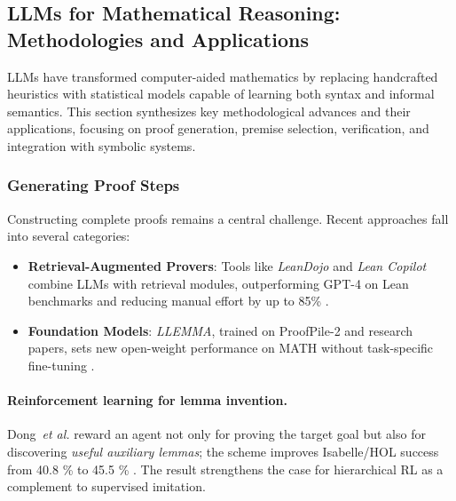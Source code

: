 \documentclass[acmsmall,anonymous]{acmart}
\begin{document}
\subsection{LLMs for Mathematical Reasoning: Methodologies and Applications}
LLMs have transformed computer-aided mathematics by replacing handcrafted heuristics with statistical models capable of learning both syntax and informal semantics. This section synthesizes key methodological advances and their applications, focusing on proof generation, premise selection, verification, and integration with symbolic systems. 

\subsubsection{Generating Proof Steps}\label{sec:proof-steps}
Constructing complete proofs remains a central challenge. Recent approaches fall into several categories:   
\begin{itemize}
    \item \textbf{Retrieval-Augmented Provers}: Tools like \emph{LeanDojo} and \emph{Lean Copilot} combine LLMs with retrieval modules, outperforming GPT-4 on Lean benchmarks and reducing manual effort by up to 85\% \cite{yang2023leandojo, huang2024leancopilot}.
    \item \textbf{Foundation Models}: \emph{LLEMMA}, trained on ProofPile-2 and research papers, sets new open-weight performance on MATH without task-specific fine-tuning \cite{azerbayev2024llemma}.
\end{itemize}

\paragraph{Reinforcement learning for lemma invention.}
Dong~\emph{et al.} reward an agent not only for proving the target
goal but also for discovering \emph{useful auxiliary lemmas}; the scheme
improves Isabelle/HOL success from 40.8 \% to 45.5 \%
\cite{dong2024lemmaRL}. The result strengthens the case for hierarchical
RL as a complement to supervised imitation.
\end{document}
